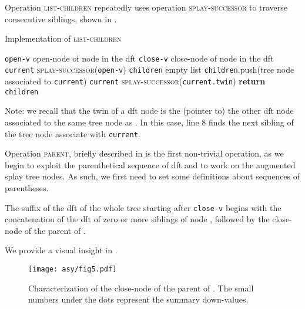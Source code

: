 \documentclass[a4paper,USenglish]{lipics}
\newcommand{\var}[1]{\textrm{\texttt{#1}}}
\begin{document}
		Operation \textsc{list-children} repeatedly uses operation \textsc{splay-successor} to traverse consecutive siblings, shown in .
		
		\begin{algorithm}[H]
		  \small
		  \caption{\small Implementation of \textsc{list-children}}
		  \label{algo:list children}
		  \begin{algorithmic}[1]
			    \State \var{open-v}  open-node of node  in the dft
				\State \var{close-v}  close-node of node  in the dft
			    \State \var{current}  \textsc{splay-successor}(\var{open-v})
			    \State \var{children}  empty list
			    \While{\var{current}  \var{close-v}}
			    	\State \var{children}.push(tree node associated to \var{current})
			    	\State \var{current}  \textsc{splay-successor}(\var{current.twin})
			    \EndWhile
			    \State \textbf{return} \var{children}
		    \EndProcedure
		  \end{algorithmic}
		  Note: we recall that the twin of a dft node  is the (pointer to) the other dft node  associated to the same tree node as . In this case, line 8 finds the next sibling of the tree node associate with \var{current}.
		\end{algorithm}	
		\vspace{2mm}
		
		Operation \textsc{parent}, briefly described in  is the first non-trivial operation, as we begin to exploit the parenthetical sequence of dft and to work on the augmented splay tree nodes. As such, we first need to set some definitions about sequences of parentheses. \begin{lemma}
			The suffix of the dft of the whole tree starting after \var{close-v} begins with the concatenation of the dft of zero or more siblings of node , followed by the close-node of the parent of . 
		\end{lemma}
		
		We provide a visual insight in .
		
		\begin{figure}[t]

\centering
			\texttt{[image: asy/fig5.pdf]}\\
			\caption{Characterization of the close-node of the parent of . The small numbers under the dots represent the summary down-values.\label{fig:close father}}
		\end{figure}
		
\end{document}
